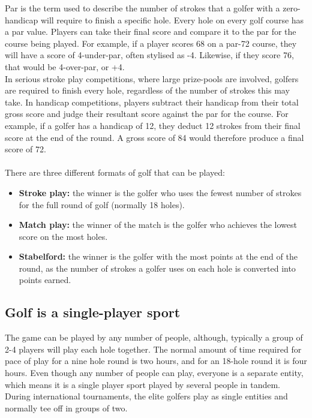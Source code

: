\documentclass[titlepage]{article}
\begin{document}
\noindent
Par is the term used to describe the number of strokes that a golfer with a zero-handicap will %
require to finish a specific hole. Every hole on every golf course has a par value. Players can %
take their final score and compare it to the par for the course being played. For example, if %
a player scores 68 on a par-72 course, they will have a score of  4-under-par, often stylised %
as -4. Likewise, if they score 76, that would be 4-over-par, or +4. \\

\noindent
In serious stroke play competitions, where large prize-pools are involved, golfers are required %
to finish every hole, regardless of the number of strokes this may take. In handicap competitions, %
players subtract their handicap from their total gross score and judge their resultant score %
against the par for the course. For example, if a golfer has a handicap of 12, they deduct 12 strokes %
from their final score at the end of the round. A gross score of 84 would therefore produce a final score of 72. \\ \\

\noindent
There are three different formats of golf that can be played:

\begin{itemize}
  \item \textbf{Stroke play:} the winner is the golfer who uses the fewest number of strokes for the full round of golf (normally 18 holes).
  \item \textbf{Match play:} the winner of the match is the golfer who achieves the lowest score on the most holes.
  \item \textbf{Stabelford:} the winner is the golfer with the most points at the end of the round, as the number of strokes a golfer uses on each hole is converted into points earned.
\end{itemize}

\subsection{Golf is a single-player sport}

The game can be played by any number of people, although, typically a group of 2-4 players will play %
each hole together. The normal amount of time required for pace of play for a nine hole round is %
two hours, and for an 18-hole round it is four hours. Even though any number of people can play, %
everyone is a separate entity, which means it is a single player sport played by several people in %
tandem. During international tournaments, the elite golfers play as single entities and normally tee %
off in groups of two.
\end{document}
